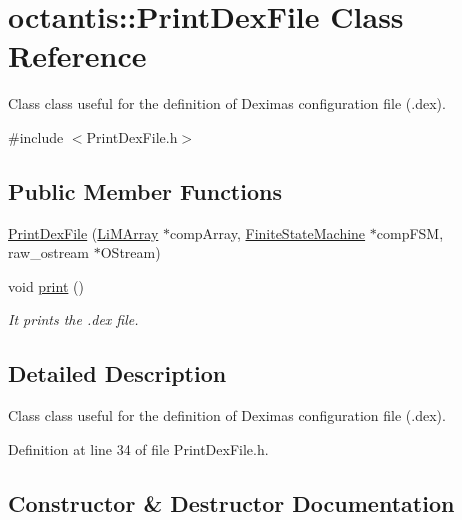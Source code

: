 \hypertarget{classoctantis_1_1PrintDexFile}{}\section{octantis\+:\+:Print\+Dex\+File Class Reference}
\label{classoctantis_1_1PrintDexFile}


Class class useful for the definition of Dexima\textquotesingle{}s configuration file (.dex).  




{\ttfamily \#include $<$Print\+Dex\+File.\+h$>$}

\subsection*{Public Member Functions}
\begin{DoxyCompactItemize}
\item 
\hyperlink{classoctantis_1_1PrintDexFile_a8419b2b9f856dbefc859a563125f203c}{Print\+Dex\+File} (\hyperlink{classoctantis_1_1LiMArray}{Li\+M\+Array} $\ast$comp\+Array, \hyperlink{classoctantis_1_1FiniteStateMachine}{Finite\+State\+Machine} $\ast$comp\+F\+SM, raw\+\_\+ostream $\ast$O\+Stream)
\item 
void \hyperlink{classoctantis_1_1PrintDexFile_a81a7a3c3c35f91aabd83c2902f56dfb1}{print} ()
\begin{DoxyCompactList}\small\item\em It prints the .dex file. \end{DoxyCompactList}\end{DoxyCompactItemize}


\subsection{Detailed Description}
Class class useful for the definition of Dexima\textquotesingle{}s configuration file (.dex). 

Definition at line 34 of file Print\+Dex\+File.\+h.



\subsection{Constructor \& Destructor Documentation}
\mbox{\label{classoctantis_1_1PrintDexFile_a8419b2b9f856dbefc859a563125f203c}} 
